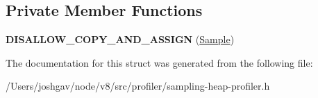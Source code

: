 \subsection*{Private Member Functions}
\begin{DoxyCompactItemize}
\item 
{\bfseries D\+I\+S\+A\+L\+L\+O\+W\+\_\+\+C\+O\+P\+Y\+\_\+\+A\+N\+D\+\_\+\+A\+S\+S\+I\+GN} (\hyperlink{structv8_1_1internal_1_1_sampling_heap_profiler_1_1_sample}{Sample})\hypertarget{structv8_1_1internal_1_1_sampling_heap_profiler_1_1_sample_a050aa96da288a5ca50a412765cc27f59}{}\label{structv8_1_1internal_1_1_sampling_heap_profiler_1_1_sample_a050aa96da288a5ca50a412765cc27f59}

\end{DoxyCompactItemize}


The documentation for this struct was generated from the following file\+:\begin{DoxyCompactItemize}
\item 
/\+Users/joshgav/node/v8/src/profiler/sampling-\/heap-\/profiler.\+h\end{DoxyCompactItemize}
